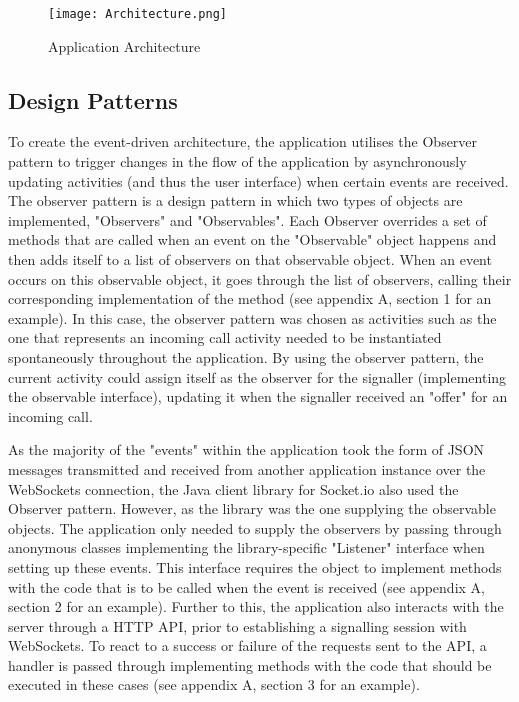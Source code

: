 \documentclass[]{report}
\begin{document}
			\begin{figure}[H]
			\caption{Application Architecture}
			\texttt{[image: Architecture.png]}
			\end{figure}	
					
			\subsection{Design Patterns}
			To create the event-driven architecture, the application utilises the Observer pattern to trigger changes in the flow of the application by asynchronously updating activities (and thus the user interface) when certain events are received. The observer pattern is a design pattern in which two types of objects are implemented, "Observers" and "Observables". Each Observer overrides a set of methods that are called when an event on the "Observable" object happens and then adds itself to a list of observers on that observable object. When an event occurs on this observable object, it goes through the list of observers, calling their corresponding implementation of the method (see appendix A, section 1 for an example). In this case, the observer pattern was chosen as activities such as the one that represents an incoming call activity needed to be instantiated spontaneously throughout the application. By using the observer pattern, the current activity could assign itself as the observer for the signaller (implementing the observable interface), updating it when the signaller received an "offer" for an incoming call. 
			
			As the majority of the "events" within the application took the form of JSON messages transmitted and received from another application instance over the WebSockets connection, the Java client library for Socket.io also used the Observer pattern. However, as the library was the one supplying the observable objects. The application only needed to supply the observers by passing through anonymous classes implementing the library-specific "Listener" interface when setting up these events. This interface requires the object to implement methods with the code that is to be called when the event is received (see appendix A, section 2 for an example). Further to this, the application also interacts with the server through a HTTP API, prior to establishing a signalling session with WebSockets. To react to a success or failure of the requests sent to the API, a handler is passed through implementing methods with the code that should be executed in these cases (see appendix A, section 3 for an example).
			
\end{document}
